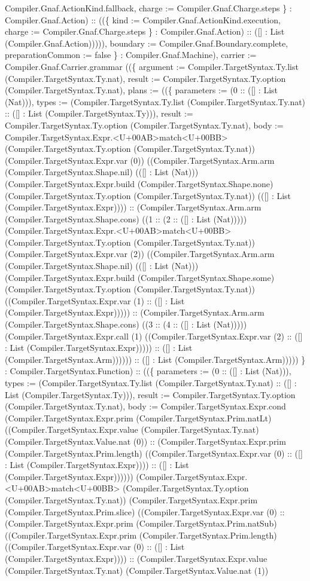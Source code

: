 \documentclass[11pt]{article}
\begin{document}
Compiler.Gnaf.ActionKind.fallback, charge := Compiler.Gnaf.Charge.steps \} : Compiler.Gnaf.Action) :: ((\{ kind := Compiler.Gnaf.ActionKind.execution, charge := Compiler.Gnaf.Charge.steps \} : Compiler.Gnaf.Action) :: ([] : List (Compiler.Gnaf.Action))))), boundary := Compiler.Gnaf.Boundary.complete, preparationCommon := false \} : Compiler.Gnaf.Machine), carrier := Compiler.Gnaf.Carrier.grammar ((\{ argument := Compiler.TargetSyntax.Ty.list (Compiler.TargetSyntax.Ty.nat), result := Compiler.TargetSyntax.Ty.option (Compiler.TargetSyntax.Ty.nat), plans := ((\{ parameters := (0 :: ([] : List (Nat))), types := (Compiler.TargetSyntax.Ty.list (Compiler.TargetSyntax.Ty.nat) :: ([] : List (Compiler.TargetSyntax.Ty))), result := Compiler.TargetSyntax.Ty.option (Compiler.TargetSyntax.Ty.nat), body := Compiler.TargetSyntax.Expr.<U+00AB>match<U+00BB> (Compiler.TargetSyntax.Ty.option (Compiler.TargetSyntax.Ty.nat)) (Compiler.TargetSyntax.Expr.var (0)) ((Compiler.TargetSyntax.Arm.arm (Compiler.TargetSyntax.Shape.nil) (([] : List (Nat))) (Compiler.TargetSyntax.Expr.build (Compiler.TargetSyntax.Shape.none) (Compiler.TargetSyntax.Ty.option (Compiler.TargetSyntax.Ty.nat)) (([] : List (Compiler.TargetSyntax.Expr)))) :: (Compiler.TargetSyntax.Arm.arm (Compiler.TargetSyntax.Shape.cons) ((1 :: (2 :: ([] : List (Nat))))) (Compiler.TargetSyntax.Expr.<U+00AB>match<U+00BB> (Compiler.TargetSyntax.Ty.option (Compiler.TargetSyntax.Ty.nat)) (Compiler.TargetSyntax.Expr.var (2)) ((Compiler.TargetSyntax.Arm.arm (Compiler.TargetSyntax.Shape.nil) (([] : List (Nat))) (Compiler.TargetSyntax.Expr.build (Compiler.TargetSyntax.Shape.some) (Compiler.TargetSyntax.Ty.option (Compiler.TargetSyntax.Ty.nat)) ((Compiler.TargetSyntax.Expr.var (1) :: ([] : List (Compiler.TargetSyntax.Expr))))) :: (Compiler.TargetSyntax.Arm.arm (Compiler.TargetSyntax.Shape.cons) ((3 :: (4 :: ([] : List (Nat))))) (Compiler.TargetSyntax.Expr.call (1) ((Compiler.TargetSyntax.Expr.var (2) :: ([] : List (Compiler.TargetSyntax.Expr))))) :: ([] : List (Compiler.TargetSyntax.Arm)))))) :: ([] : List (Compiler.TargetSyntax.Arm))))) \} : Compiler.TargetSyntax.Function) :: ((\{ parameters := (0 :: ([] : List (Nat))), types := (Compiler.TargetSyntax.Ty.list (Compiler.TargetSyntax.Ty.nat) :: ([] : List (Compiler.TargetSyntax.Ty))), result := Compiler.TargetSyntax.Ty.option (Compiler.TargetSyntax.Ty.nat), body := Compiler.TargetSyntax.Expr.cond (Compiler.TargetSyntax.Expr.prim (Compiler.TargetSyntax.Prim.natLt) ((Compiler.TargetSyntax.Expr.value (Compiler.TargetSyntax.Ty.nat) (Compiler.TargetSyntax.Value.nat (0)) :: (Compiler.TargetSyntax.Expr.prim (Compiler.TargetSyntax.Prim.length) ((Compiler.TargetSyntax.Expr.var (0) :: ([] : List (Compiler.TargetSyntax.Expr)))) :: ([] : List (Compiler.TargetSyntax.Expr)))))) (Compiler.TargetSyntax.Expr.<U+00AB>match<U+00BB> (Compiler.TargetSyntax.Ty.option (Compiler.TargetSyntax.Ty.nat)) (Compiler.TargetSyntax.Expr.prim (Compiler.TargetSyntax.Prim.slice) ((Compiler.TargetSyntax.Expr.var (0) :: (Compiler.TargetSyntax.Expr.prim (Compiler.TargetSyntax.Prim.natSub) ((Compiler.TargetSyntax.Expr.prim (Compiler.TargetSyntax.Prim.length) ((Compiler.TargetSyntax.Expr.var (0) :: ([] : List (Compiler.TargetSyntax.Expr)))) :: (Compiler.TargetSyntax.Expr.value (Compiler.TargetSyntax.Ty.nat) (Compiler.TargetSyntax.Value.nat (1)) 
\end{document}

